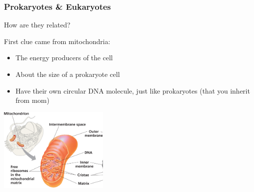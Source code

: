\documentclass[10pt]{beamer}
\begin{document}
\begin{frame}[t]
\frametitle{Prokaryotes \& Eukaryotes}
\vspace{0.25cm}

	\begin{center}
		\textcolor{myblue}{How are they related?}
	\end{center}

	\vspace{0.25cm}
	
	First clue came from mitochondria:
		\medskip
		\begin{itemize}
			\item The energy producers of the cell
			\medskip
			\item About the size of a prokaryote cell
			\medskip
			\item Have their own circular DNA molecule, just like prokaryotes (that you inherit from mom)
		\end{itemize}	
	
	\begin{center}
		\includegraphics[width=0.4\textwidth]{figures/fg06_17a.jpg}
	\end{center}	
\end{frame}
\end{document}
